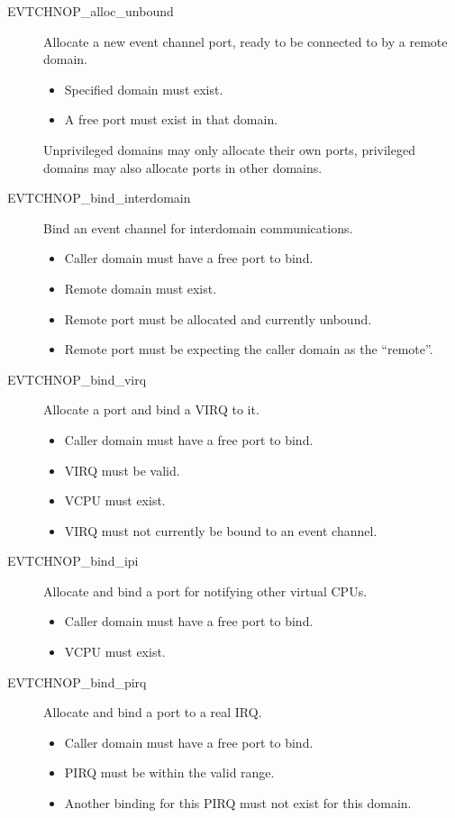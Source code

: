 \documentclass[11pt,twoside,final,openright]{report}
\begin{document}
\begin{description}

\item[EVTCHNOP\_alloc\_unbound]
  Allocate a new event channel port, ready to be connected to by a
  remote domain.
  \begin{itemize}
  \item Specified domain must exist.
  \item A free port must exist in that domain.
  \end{itemize}
  Unprivileged domains may only allocate their own ports, privileged
  domains may also allocate ports in other domains.
\item[EVTCHNOP\_bind\_interdomain]
  Bind an event channel for interdomain communications.
  \begin{itemize}
  \item Caller domain must have a free port to bind.
  \item Remote domain must exist.
  \item Remote port must be allocated and currently unbound.
  \item Remote port must be expecting the caller domain as the ``remote''.
  \end{itemize}
\item[EVTCHNOP\_bind\_virq]
  Allocate a port and bind a VIRQ to it.
  \begin{itemize}
  \item Caller domain must have a free port to bind.
  \item VIRQ must be valid.
  \item VCPU must exist.
  \item VIRQ must not currently be bound to an event channel.
  \end{itemize}
\item[EVTCHNOP\_bind\_ipi]
  Allocate and bind a port for notifying other virtual CPUs.
  \begin{itemize}
  \item Caller domain must have a free port to bind.
  \item VCPU must exist.
  \end{itemize}
\item[EVTCHNOP\_bind\_pirq]
  Allocate and bind a port to a real IRQ.
  \begin{itemize}
  \item Caller domain must have a free port to bind.
  \item PIRQ must be within the valid range.
  \item Another binding for this PIRQ must not exist for this domain.

\end{itemize}
\end{description}
\end{document}
